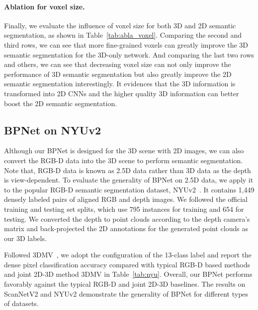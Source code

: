 \documentclass[final]{cvpr}
\begin{document}
\vspace{-4mm}
\paragraph{Ablation for voxel size.}

Finally, we evaluate the influence of voxel size for both 3D and 2D semantic segmentation, as shown in Table~\ref{tab:abla_voxel}.
Comparing the second and third rows, we can see that more fine-grained voxels can greatly improve the 3D semantic segmentation for the 3D-only network.
And comparing the last two rows and others, we can see that decreasing voxel size can not only improve the performance of 3D semantic segmentation but also greatly improve the 2D semantic segmentation interestingly.
It evidences that the 3D information is transformed into 2D CNNs and the higher quality 3D information can better boost the 2D semantic segmentation.




\vspace{-1.5mm}
\subsection{BPNet on NYUv2}
\vspace{-1.5mm}
Although our BPNet is designed for the 3D scene with 2D images, we can also convert the RGB-D data into the 3D scene to perform semantic segmentation.
Note that, RGB-D data is known as 2.5D data rather than 3D data as the depth is view-dependent.
To evaluate the generality of BPNet on 2.5D data, we apply it to the popular RGB-D semantic segmentation dataset, NYUv2~\cite{Silberman:ECCV12}.
It contains 1,449 densely labeled pairs of aligned RGB and depth images.
We followed the official training and testing set splits, which use 795 instances for training and 654 for testing.
We converted the depth to point clouds according to the depth camera's matrix and back-projected the 2D annotations for the generated point clouds as our 3D labels.


Followed 3DMV~\cite{dai20183dmv}, we adopt the configuration of the 13-class label and report the dense pixel classification accuracy compared with typical RGB-D based methods and joint 2D-3D method 3DMV in Table~\ref{tab:nyu}.
Overall, our BPNet performs favorably against the typical RGB-D and joint 2D-3D baselines.
The results on ScanNetV2 and NYUv2 demonstrate the generality of BPNet for different types of datasets.
\end{document}
